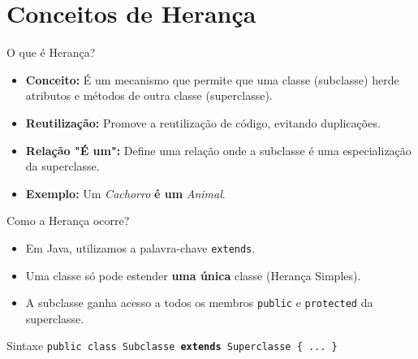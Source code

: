 \documentclass[9pt]{beamer}
\begin{document}
\section{Conceitos de Herança}
\begin{frame}{O que é Herança?}
    \begin{itemize}
        \item \textbf{Conceito:} É um mecanismo que permite que uma classe (subclasse) herde atributos e métodos de outra classe (superclasse).
        \item \textbf{Reutilização:} Promove a reutilização de código, evitando duplicações.
        \item \textbf{Relação "É um":} Define uma relação onde a subclasse é uma especialização da superclasse.
        \item \textbf{Exemplo:} Um \textit{Cachorro} \textbf{é um} \textit{Animal}.
    \end{itemize}
    
    \centering
\end{frame}

\begin{frame}{Como a Herança ocorre?}
    \begin{itemize}
        \item Em Java, utilizamos a palavra-chave \texttt{extends}.
        \item Uma classe só pode estender \textbf{uma única} classe (Herança Simples).
        \item A subclasse ganha acesso a todos os membros \texttt{public} e \texttt{protected} da superclasse.
    \end{itemize}
    
    \begin{block}{Sintaxe}
        \texttt{public class Subclasse \textbf{extends} Superclasse \{ ... \}}
    \end{block}
\end{frame}
\end{document}
